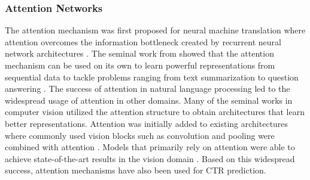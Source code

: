 \documentclass{article}
\begin{document}
\subsubsection{Attention Networks}
The attention mechanism was first proposed for neural machine translation where attention overcomes the information bottleneck created by recurrent neural network architectures \cite{bahdanau2014neural}. The seminal work from \cite{vaswani2017attention} showed that the attention mechanism can be used on its own to learn powerful representations from sequential data to tackle problems ranging from text summarization \cite{el2021automatic} to question answering \cite{yu2019deep}.  The success of attention in natural language processing led to the widespread usage of attention in other domains. Many of the seminal works in computer vision utilized the attention structure to obtain architectures that learn better representations. Attention was initially added to existing architectures where commonly used vision blocks such as convolution and pooling were combined with attention \cite{wang2020eca, hu2018squeeze, woo2018cbam}. Models that primarily rely on attention were able to achieve state-of-the-art results in the vision domain \cite{khan2022transformers, dosovitskiy2021image}. Based on this widespread success, attention mechanisms have also been used for CTR prediction.
\end{document}
